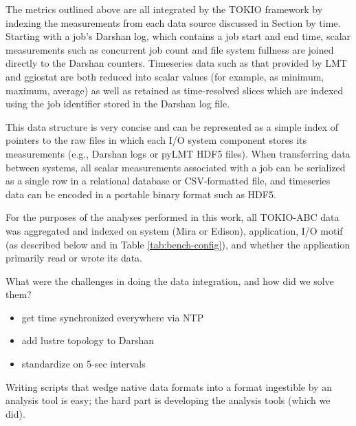
The metrics outlined above are all integrated by the TOKIO framework by indexing the measurements from each data source discussed in Section \label{sec:methods} by time.
Starting with a job's Darshan log, which contains a job start and end time, scalar measurements such as concurrent job count and file system fullness are joined directly to the Darshan counters.
Timeseries data such as that provided by LMT and ggiostat are both reduced into scalar values (for example, as minimum, maximum, average) as well as retained as time-resolved slices which are indexed using the job identifier stored in the Darshan log file.

This data structure is very concise and can be represented as a simple index of pointers to the raw files in which each I/O system component stores its measurements (e.g., Darshan logs or pyLMT HDF5 files).
When transferring data between systems, all scalar measurements associated with a job can be serialized as a single row in a relational database or CSV-formatted file, and timeseries data can be encoded in a portable binary format such as HDF5.

For the purposes of the analyses performed in this work, all TOKIO-ABC data was aggregated and indexed on system (Mira or Edison), application, I/O motif (as described below and in Table \ref{tab:bench-config}), and whether the application primarily read or wrote its data. 


What were the challenges in doing the data integration, and how did we solve them?

\begin{itemize}
    \item get time synchronized everywhere via NTP
    \item add lustre topology to Darshan
    \item standardize on 5-sec intervals
\end{itemize}

Writing scripts that wedge native data formats into a format ingestible by an analysis tool is easy; the hard part is developing the analysis tools (which we did).

